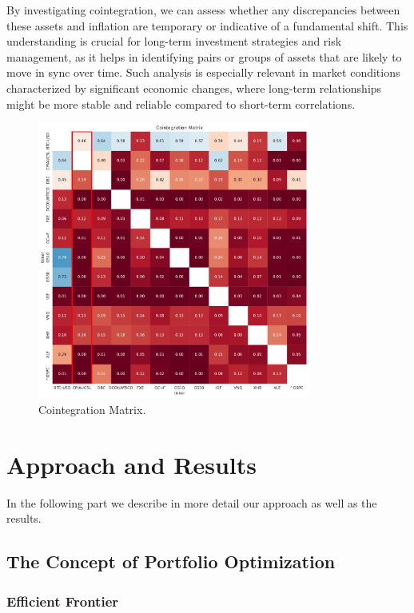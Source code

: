 \documentclass{article}
\begin{document}
By investigating cointegration, we can assess whether any discrepancies between these assets and inflation are temporary or indicative of a fundamental shift. This understanding is crucial for long-term investment strategies and risk management, as it helps in identifying pairs or groups of assets that are likely to move in sync over time. Such analysis is especially relevant in market conditions characterized by significant economic changes, where long-term relationships might be more stable and reliable compared to short-term correlations.

\begin{figure}[H]
    \centering
    \includegraphics[width=0.8\textwidth]{paper/figure/Cointegration_Matrix.pdf}
    \caption{Cointegration Matrix.}
    \label{fig:mesh3}
\end{figure}

\section{Approach and Results}

In the following part we describe in more detail our approach as well as the results. 

\subsection{The Concept of Portfolio Optimization}

\subsubsection*{Efficient Frontier}
\end{document}
